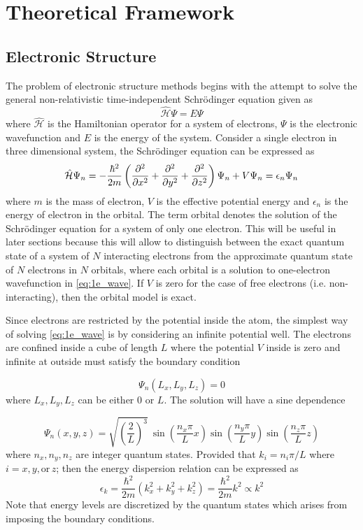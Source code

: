 \chapter{Theoretical Framework} \label{chap:theory}
\section{Electronic Structure}
The problem of electronic structure methods begins with the attempt to solve the general non-relativistic time-independent Schr\"{o}dinger equation given as \citep{Schroedinger1926}
\begin{equation} \label{eq:schrodinger}
	\hat{\mathcal{H}} \Psi = E \Psi
\end{equation}
where $\hat{\mathcal{H}}$ is the Hamiltonian operator for a system of electrons, $\Psi$ is the electronic wavefunction and $E$ is the energy of the system. Consider a single electron in three dimensional system, the Schr\"{o}dinger equation can be expressed as
\begin{equation} \label{eq:1e_wave}
	\hat{\mathcal{H}} \Psi_n = - \frac{\hbar^2}{2m} \left(\pdv[2]{x} + \pdv[2]{y} + \pdv[2]{z} \right) \Psi_n + V \Psi_n  = \epsilon_n \Psi_n
\end{equation}
where $m$ is the mass of electron, $V$ is the effective potential energy and $\epsilon_n$ is the energy of electron in the orbital. The term orbital denotes the solution of the Schr\"{o}dinger equation for a system of only one electron. This will be useful in later sections because this will allow to distinguish between the exact quantum state of a system of $N$ interacting  electrons
from the approximate quantum state of $N$ electrons in $N$ orbitals, where each orbital is a solution to one-electron wavefunction in \eqref{eq:1e_wave}. If $V$ is zero for the case of free electrons (i.e. non-interacting), then the orbital model is exact.

Since electrons are restricted by the potential inside the atom, the simplest way of solving \eqref{eq:1e_wave} is by considering an infinite potential well. The electrons are confined inside a cube of length $L$ where the potential $V$ inside is zero and infinite at outside must satisfy the boundary condition

\begin{equation}
	\Psi_n(L_x,L_y,L_z) = 0
\end{equation}
where $L_x,L_y,L_z$ can be either 0 or $L$. The solution will have a sine dependence

\begin{equation}
	\Psi_n(x,y,z) = \sqrt{\left(\frac{2}{L}\right)^3} \ \sin(\frac{n_x \pi }{L} x) \sin(\frac{n_y \pi}{L} y) \sin(\frac{n_z \pi}{L} z)
\end{equation}
where $n_x,n_y,n_z$ are integer quantum states. Provided that $ k_i = n_i \pi / L$ where $i=x,y, \text{or}\, z$; then the energy dispersion relation can be expressed as
\begin{equation} \label{eq:free_e}
	\epsilon_k = \frac{\hbar^2}{2m} (k_x^2 + k_y^2 + k_z^2) = \frac{\hbar^2}{2m} k^2 \propto k^2
\end{equation}
Note that energy levels are discretized by the quantum states which arises from imposing the boundary conditions.
